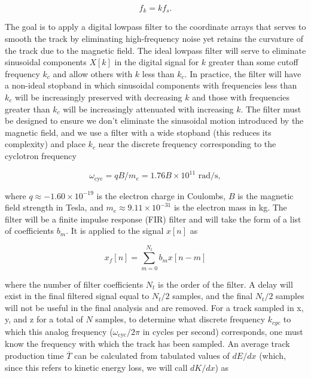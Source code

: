 \documentclass{JINST}
\begin{document}
\begin{equation}
f_{k} = kf_{s}.
\end{equation}

The goal is to apply a digital lowpass filter to the coordinate arrays that serves to
smooth the track by eliminating high-frequency noise yet retains the curvature of the track
due to the magnetic field.  The ideal lowpass filter will serve to eliminate sinusoidal components
$X[k]$ in the digital signal for $k$ greater than some cutoff frequency $k_{c}$ and allow 
others with $k$ less than $k_{c}$.  In practice, the filter will have a non-ideal stopband in which sinusoidal 
components with frequencies less than $k_{c}$ will be increasingly preserved with decreasing $k$ and those 
with frequencies greater than $k_{c}$ will be increasingly attenuated with increasing $k$.  The filter must be 
designed to ensure we don't eliminate the sinusoidal motion introduced by the magnetic field, and we use a
filter with a wide stopband (this reduces its complexity) and place $k_{c}$ near the discrete frequency 
corresponding to the cyclotron frequency


\begin{equation}\label{eqn_wcyc}
\omega_{\mathrm{cyc}} = qB/m_{e} = 1.76B \times 10^{11} \,\, \mathrm{rad/s},
\end{equation}

\noindent where $q \approx -1.60 \times 10^{-19}$ is the electron charge in Coulombs, $B$ is the magnetic field
strength in Tesla, and $m_{e} \approx 9.11 \times 10^{-31}$ is the electron mass in kg.  The filter will be a finite impulse response (FIR) filter and will take the form of a  list of coefficients $b_{m}$.  It is applied to the signal $x[n]$ as

\begin{equation}
x_{f}[n] = \sum_{m=0}^{N_t} b_{m}x[n-m]
\end{equation}

\noindent where the number of filter coefficients $N_{t}$ is the order of the filter.  A delay will exist in the
final filtered signal equal to $N_{t}/2$ samples, and the final $N_{t}/2$ samples will not be useful in the final analysis and are removed.
For a track sampled in x, y, and z for a total of $N$ samples, to determine what discrete frequency $k_{cyc}$ to which this analog frequency ($\omega_{\mathrm{cyc}}/2\pi$ in cycles per second) corresponds, one must know the frequency with which the track has been sampled.  An average track production time $\overline{T}$ can be calculated from tabulated values of $dE/dx$ (which, since this refers to kinetic energy loss, we will call $dK/dx$) as
\end{document}
